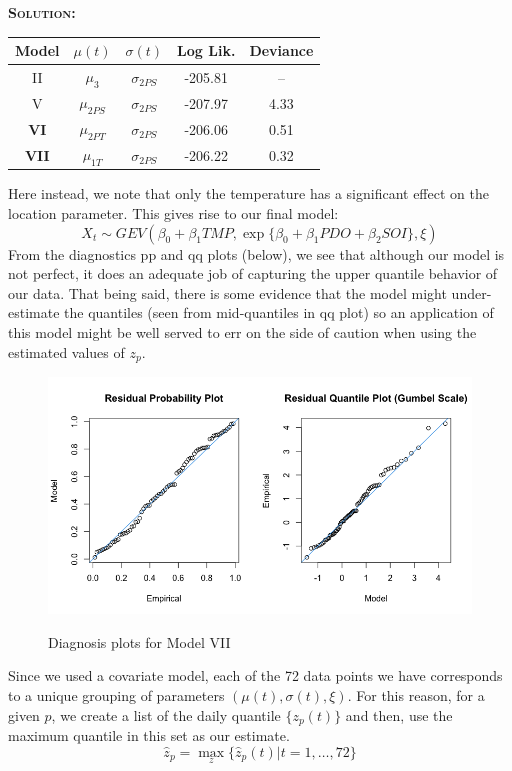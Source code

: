 \documentclass[12pt,oneside]{article}
\newenvironment{solution}
    {\textbf{\textsc{Solution:}}\\}
    {\newpage}
\begin{document}
\begin{solution}
\begin{center}
    \begin{tabular}{||c||c|c|c|c||}\hline
     Model& $\mu(t)$ & $\sigma(t)$&Log Lik.& Deviance \\\hline
     II&$\mu_3$ & $\sigma_{2PS}$ & -205.81 & --  \\\hline
     V& $\mu_{2PS}$ & $\sigma_{2PS}$ & -207.97 & 4.33\\\hline
     \textbf{VI}& $\mu_{2PT}$ & $\sigma_{2PS}$ & -206.06 & 0.51 \\\hline
     \textbf{VII}& $\mu_{1T}$ & $\sigma_{2PS}$ &  -206.22 & 0.32 \\\hline
\end{tabular}
\end{center}
Here instead, we note that only the temperature has a significant effect on the location parameter. This gives rise to our final model:
\[X_t\sim GEV(\beta_0+\beta_1TMP, \exp\{\beta_0+\beta_1PDO+\beta_2SOI\}, \xi)\]
From the diagnostics pp and qq plots (below), we see that although our model is not perfect, it does an adequate job of capturing the upper quantile behavior of our data. That being said, there is some evidence that the model might under-estimate the quantiles (seen from mid-quantiles in qq plot) so an application of this model might be well served to err on the side of caution when using the estimated values of $z_p$.
\begin{figure}[H]
\begin{center}
{\includegraphics[width=5in]{Assignments/a3/mod7-diag.png}}
\caption{Diagnosis plots for Model VII}
\end{center}
\end{figure}
Since we used a covariate model, each of the 72 data points we have corresponds to a unique grouping of parameters $(\mu(t), \sigma(t), \xi)$. For this reason, for a given $p$, we create a list of the daily quantile $\{z_p(t)\}$ and then, use the maximum quantile in this set as our estimate. 
\[\hat{z}_p = \max_{z}\{\hat{z}_p(t)| t=1,\hdots,72\}\]


\end{solution}
\end{document}
